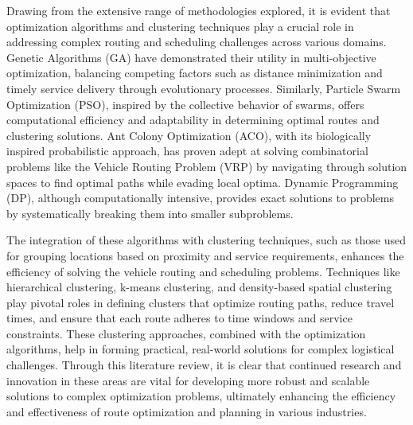 Drawing from the extensive range of methodologies explored, it is evident that optimization algorithms and clustering techniques play a crucial role in addressing complex routing and scheduling challenges across various domains. Genetic Algorithms (GA) have demonstrated their utility in multi-objective optimization, balancing competing factors such as distance minimization and timely service delivery through evolutionary processes. Similarly, Particle Swarm Optimization (PSO), inspired by the collective behavior of swarms, offers computational efficiency and adaptability in determining optimal routes and clustering solutions. Ant Colony Optimization (ACO), with its biologically inspired probabilistic approach, has proven adept at solving combinatorial problems like the Vehicle Routing Problem (VRP) by navigating through solution spaces to find optimal paths while evading local optima. Dynamic Programming (DP), although computationally intensive, provides exact solutions to problems by systematically breaking them into smaller subproblems.

The integration of these algorithms with clustering techniques, such as those used for grouping locations based on proximity and service requirements, enhances the efficiency of solving the vehicle routing and scheduling problems. Techniques like hierarchical clustering, k-means clustering, and density-based spatial clustering play pivotal roles in defining clusters that optimize routing paths, reduce travel times, and ensure that each route adheres to time windows and service constraints. These clustering approaches, combined with the optimization algorithms, help in forming practical, real-world solutions for complex logistical challenges. Through this literature review, it is clear that continued research and innovation in these areas are vital for developing more robust and scalable solutions to complex optimization problems, ultimately enhancing the efficiency and effectiveness of route optimization and planning in various industries.









